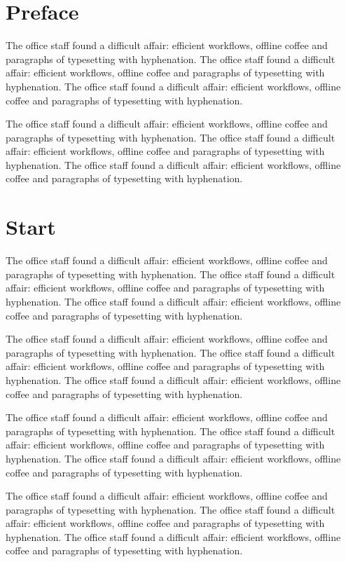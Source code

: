 \documentclass{book}
\begin{document}
\frontmatter
\chapter{Preface}
The office staff found a difficult affair: efficient workflows, offline coffee and paragraphs of typesetting with hyphenation. The office staff found a difficult affair: efficient workflows, offline coffee and paragraphs of typesetting with hyphenation. The office staff found a difficult affair: efficient workflows, offline coffee and paragraphs of typesetting with hyphenation. 

The office staff found a difficult affair: efficient workflows, offline coffee and paragraphs of typesetting with hyphenation. The office staff found a difficult affair: efficient workflows, offline coffee and paragraphs of typesetting with hyphenation. The office staff found a difficult affair: efficient workflows, offline coffee and paragraphs of typesetting with hyphenation. 

\mainmatter
\chapter{Start}
The office staff found a difficult affair: efficient workflows, offline coffee and paragraphs of typesetting with hyphenation. The office staff found a difficult affair: efficient workflows, offline coffee and paragraphs of typesetting with hyphenation. The office staff found a difficult affair: efficient workflows, offline coffee and paragraphs of typesetting with hyphenation. 

The office staff found a difficult affair: efficient workflows, offline coffee and paragraphs of typesetting with hyphenation. The office staff found a difficult affair: efficient workflows, offline coffee and paragraphs of typesetting with hyphenation. The office staff found a difficult affair: efficient workflows, offline coffee and paragraphs of typesetting with hyphenation. 

The office staff found a difficult affair: efficient workflows, offline coffee and paragraphs of typesetting with hyphenation. The office staff found a difficult affair: efficient workflows, offline coffee and paragraphs of typesetting with hyphenation. The office staff found a difficult affair: efficient workflows, offline coffee and paragraphs of typesetting with hyphenation. 

The office staff found a difficult affair: efficient workflows, offline coffee and paragraphs of typesetting with hyphenation. The office staff found a difficult affair: efficient workflows, offline coffee and paragraphs of typesetting with hyphenation. The office staff found a difficult affair: efficient workflows, offline coffee and paragraphs of typesetting with hyphenation. 
\end{document}
